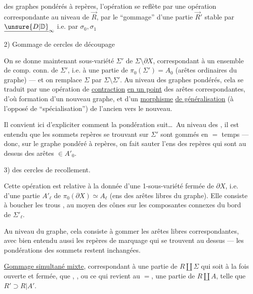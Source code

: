 des graphes pondérés à repères, l'opération  se reflète par une opération correspondante au niveau de $\vec R$, par le ``gommage'' d'une partie $\vec R'$ stable par $\underline{\unsure{D|\mathbb D}}_\infty$ i.e. par $\sigma_0,\sigma_1$

2) Gommage de cercles de découpage

On se donne maintenant  sous-variété  $\Sigma'$ de $\Sigma\setminus\partial X$, correspondant à un ensemble  de comp. conn. de $\Sigma'$, i.e. à une partie  de $\pi_0(\Sigma')=A_0$ (arêtes ordinaires du graphe) --- et on remplace $\Sigma$ par $\Sigma\setminus\Sigma'$. Au niveau des graphes pondérés, cela se traduit par une opération de \uline{contraction} \uline{en un point} des arêtes correspondantes, d'où formation d'un nouveau graphe, et d'un \uline{morphisme} \uline{de généralisation} (à l'opposé de ``spécialisation'') de l'ancien vers le nouveau.

Il convient ici d'expliciter comment la pondération suit\ldots\ Au niveau des  , il est entendu que les sommets repères se trouvant sur $\Sigma'$ sont gommés en $=$ temps --- donc, sur le graphe pondéré à repères, on fait sauter l'ens des repères qui sont au dessus des arêtes $\in A'_0$.

3)   des cercles de recollement.

Cette opération est relative à la donnée d'une 1-sous-variété fermée de $\partial X$, i.e. d'une partie $A'_{\ell}$ de $\pi_0(\partial X)\simeq A_{\ell}$ (ens des arêtes libres du graphe). Elle consiste à boucher les trous , au moyen des cônes sur les composantes connexes du bord de $\Sigma'_{\ell}$.

Au niveau du graphe, cela consiste à gommer les arêtes libres correspondantes, avec bien entendu aussi les repères de marquage qui se trouvent au dessus ---  les pondérations des sommets restent inchangées.

\quad \uline{Gommage simultané mixte},  correspondant à une partie    de $R\amalg\Sigma$ qui soit à la fois ouverte et fermée,   que  , , ou ce qui revient au $=$, une partie  de $R\amalg A$, telle que $R'\supset R|A'$.

